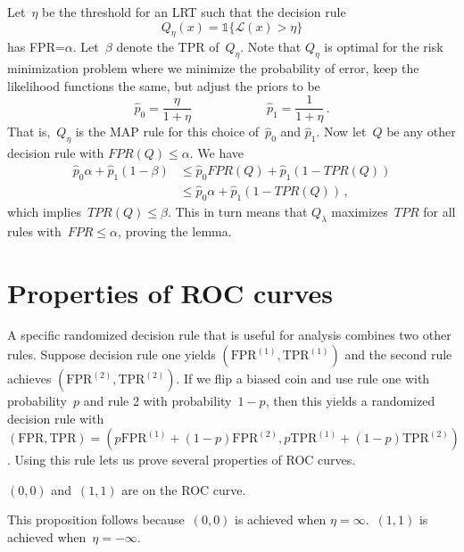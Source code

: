\documentclass{tufte-book}
\begin{document}
\begin{Proof}

Let~\(\eta\) be the threshold for an LRT such that the decision rule \[
 Q_\eta(x)= \mathbb{1}\{ \mathcal{L}(x) > \eta\}
\] has FPR=\(\alpha\). Let~\(\beta\) denote the TPR of~\(Q_\eta\). Note
that \(Q_\eta\) is optimal for the risk minimization problem where we
minimize the probability of error, keep the likelihood functions the
same, but adjust the priors to be \[
    \hat{p}_0=\frac{\eta}{1+\eta} \qquad\qquad\qquad \hat{p}_1 = \frac{1}{1+\eta}\,.
\] That is,~\(Q_\eta\) is the MAP rule for this choice of~\(\hat{p}_0\)
and \(\hat{p}_1\). Now let~\(Q\) be any other decision rule with
\(FPR(Q)\leq \alpha\). We have \[
\begin{aligned}
    \hat{p}_0 \alpha + \hat{p}_1 (1-\beta)
    &\leq \hat{p}_0 FPR(Q) + \hat{p}_1 (1-TPR(Q))  \\
    &\leq  \hat{p}_0 \alpha + \hat{p}_1 (1-TPR(Q))\,,
\end{aligned}
\] which implies~\(TPR(Q) \leq \beta\). This in turn means that
\(Q_\lambda\) maximizes~\(TPR\) for all rules with~\(FPR\leq \alpha\),
proving the lemma.

\end{Proof}

\hypertarget{properties-of-roc-curves}{%
\section{Properties of ROC curves}\label{properties-of-roc-curves}}

A specific randomized decision rule that is useful for analysis combines
two other rules. Suppose decision rule one yields
\((\mathrm{FPR}^{(1)},\mathrm{TPR}^{(1)})\) and the second rule achieves
\((\mathrm{FPR}^{(2)},\mathrm{TPR}^{(2)})\). If we flip a biased coin
and use rule one with probability~\(p\) and rule 2 with
probability~\(1-p\), then this yields a randomized decision rule with
\((\mathrm{FPR},\mathrm{TPR}) = (p\mathrm{FPR}^{(1)}+(1-p)\mathrm{FPR}^{(2)} ,p \mathrm{TPR}^{(1)}+(1-p)\mathrm{TPR}^{(2)})\).
Using this rule lets us prove several properties of ROC curves.

\begin{Proposition}

\((0,0)\) and~\((1,1)\) are on the ROC curve.

\end{Proposition}

This proposition follows because~\((0,0)\) is achieved when
\(\eta = \infty\).~\((1,1)\) is achieved when~\(\eta = -\infty\).
\end{document}
